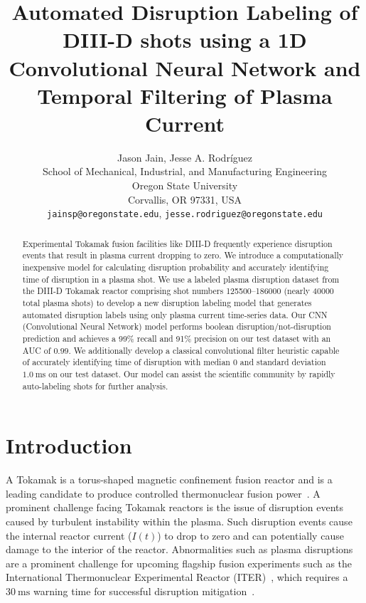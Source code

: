 \documentclass[twocolumn]{article}
\title{Automated Disruption Labeling of DIII-D shots using a 1D Convolutional Neural Network and Temporal Filtering of Plasma Current}
\author{
  Jason Jain, Jesse A. Rodríguez \\
  School of Mechanical, Industrial, and Manufacturing Engineering \\
  Oregon State University \\
  Corvallis, OR 97331, USA \\
  \texttt{jainsp@oregonstate.edu}, \texttt{jesse.rodriguez@oregonstate.edu}
}
\begin{document}
\begin{strip}
  \maketitle
  \begin{abstract}
  Experimental Tokamak fusion facilities like DIII-D frequently experience disruption events that result in plasma current dropping to zero. We introduce a computationally inexpensive model for calculating disruption probability and accurately identifying time of disruption in a plasma shot. We use a labeled plasma disruption dataset from the DIII-D Tokamak reactor comprising shot numbers 125500--186000 (nearly $\num{40000}$ total plasma shots) to develop a new disruption labeling model that generates automated disruption labels using only plasma current time-series data. Our CNN (Convolutional Neural Network) model performs boolean disruption/not-disruption prediction and achieves a 99\% recall and 91\% precision on our test dataset with an AUC of $0.99$. We additionally develop a classical convolutional filter heuristic capable of accurately identifying time of disruption with median $0$ and standard deviation $\qty{1.0}{\milli\s}$ on our test dataset. Our model can assist the scientific community by rapidly auto-labeling shots for further analysis. 
  \end{abstract}
  \vspace{1.5em}
\end{strip}


\section{Introduction}
\label{sec:intro}

A Tokamak is a torus-shaped magnetic confinement fusion reactor and is a leading candidate to produce controlled thermonuclear fusion power~\cite{WANG2023163}. A prominent challenge facing Tokamak reactors is the issue of disruption events caused by turbulent instability within the plasma. Such disruption events cause the internal reactor current ($I(t)$) to drop to zero and can potentially cause damage to the interior of the reactor. Abnormalities such as plasma disruptions are a prominent challenge for upcoming flagship fusion experiments such as the International Thermonuclear Experimental Reactor (ITER)~\cite{su16104089, WANG2023163}, which requires a $\qty{30}{\milli\s}$ warning time for successful disruption mitigation~\cite{deVries2016}.
\end{document}
